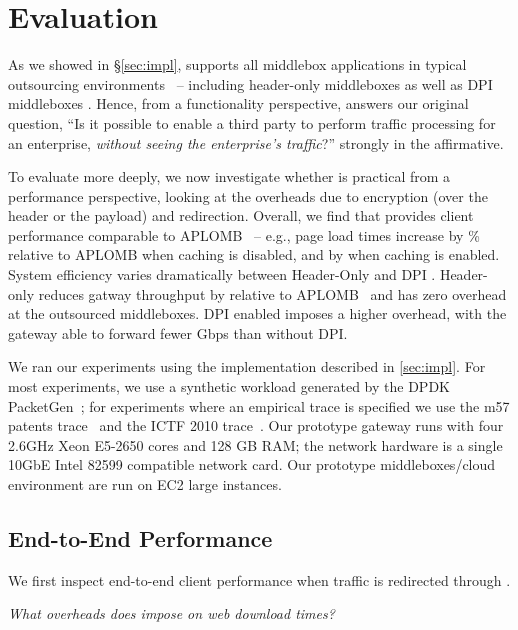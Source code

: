 
\section{Evaluation} \label{sec:eval}

As we showed in \S\ref{sec:impl}, \sys supports all middlebox applications in typical outsourcing environments~\cite{aplomb,nfv} -- including header-only middleboxes as well as DPI middleboxes . 
Hence, from a functionality perspective, \sys answers our original question, ``Is it possible to enable a third party to perform traffic processing for an enterprise, {\em without seeing the enterprise's traffic}?''  strongly in the affirmative.

To evaluate \sys more deeply, we now investigate whether \sys is practical from a performance perspective, looking at the overheads due to encryption (over the header or the payload) and redirection. 
Overall, we find that \sys provides client performance comparable to APLOMB~\cite{aplomb} -- e.g., page load times increase by \% relative to APLOMB when caching is disabled, and by  when caching is enabled.
System efficiency varies dramatically between Header-Only \sys and DPI \sys.
Header-only \sys reduces gatway throughput by  relative to APLOMB~\cite{aplomb} and has zero overhead at the outsourced middleboxes. 
DPI \sys enabled imposes a higher overhead, with the gateway able to forward  fewer Gbps than \sys without DPI.

We ran our experiments using the implementation described in \ref{sec:impl}. 
For most experiments, we use a synthetic workload generated by the DPDK PacketGen~\cite{pktgen}; for experiments where an empirical trace is specified we use the m57 patents trace~\cite{patents} and the ICTF 2010 trace~\cite{ictf}.
Our prototype gateway runs with four 2.6GHz Xeon E5-2650 cores and 128 GB RAM; the network hardware is a single 10GbE Intel 82599 compatible network card.
Our prototype middleboxes/cloud environment are run on EC2 large instances.
  

\subsection{End-to-End Performance}
We first inspect end-to-end client performance when traffic is redirected through \sys.

{\it What overheads does \sys impose on web download times?}

